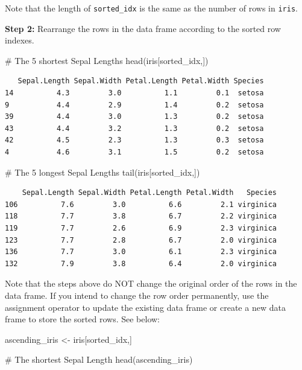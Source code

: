 \documentclass[
  letterpaper,
  DIV=11,
  numbers=noendperiod]{scrreprt}
\newenvironment{Shaded}{\begin{snugshade}}{\end{snugshade}}
\newcommand{\CommentTok}[1]{\textcolor[rgb]{0.37,0.37,0.37}{#1}}
\newcommand{\FunctionTok}[1]{\textcolor[rgb]{0.28,0.35,0.67}{#1}}
\newcommand{\NormalTok}[1]{\textcolor[rgb]{0.00,0.23,0.31}{#1}}
\newcommand{\OtherTok}[1]{\textcolor[rgb]{0.00,0.23,0.31}{#1}}
\begin{document}
Note that the length of \texttt{sorted\_idx} is the same as the number
of rows in \texttt{iris}.

\textbf{Step 2:} Rearrange the rows in the data frame according to the
sorted row indexes.

\begin{Shaded}
\begin{Highlighting}[]
\CommentTok{\# The 5 shortest Sepal Lengths}
\FunctionTok{head}\NormalTok{(iris[sorted\_idx,])}
\end{Highlighting}
\end{Shaded}

\begin{verbatim}
   Sepal.Length Sepal.Width Petal.Length Petal.Width Species
14          4.3         3.0          1.1         0.1  setosa
9           4.4         2.9          1.4         0.2  setosa
39          4.4         3.0          1.3         0.2  setosa
43          4.4         3.2          1.3         0.2  setosa
42          4.5         2.3          1.3         0.3  setosa
4           4.6         3.1          1.5         0.2  setosa
\end{verbatim}

\begin{Shaded}
\begin{Highlighting}[]
\CommentTok{\# The 5 longest Sepal Lengths}
\FunctionTok{tail}\NormalTok{(iris[sorted\_idx,])}
\end{Highlighting}
\end{Shaded}

\begin{verbatim}
    Sepal.Length Sepal.Width Petal.Length Petal.Width   Species
106          7.6         3.0          6.6         2.1 virginica
118          7.7         3.8          6.7         2.2 virginica
119          7.7         2.6          6.9         2.3 virginica
123          7.7         2.8          6.7         2.0 virginica
136          7.7         3.0          6.1         2.3 virginica
132          7.9         3.8          6.4         2.0 virginica
\end{verbatim}

Note that the steps above do NOT change the original order of the rows
in the data frame. If you intend to change the row order permanently,
use the assignment operator to update the existing data frame or create
a new data frame to store the sorted rows. See below:

\begin{Shaded}
\begin{Highlighting}[]
\NormalTok{ascending\_iris }\OtherTok{\textless{}{-}}\NormalTok{ iris[sorted\_idx,]}

\CommentTok{\# The shortest Sepal Length}
\FunctionTok{head}\NormalTok{(ascending\_iris)}
\end{Highlighting}
\end{Shaded}
\end{document}
